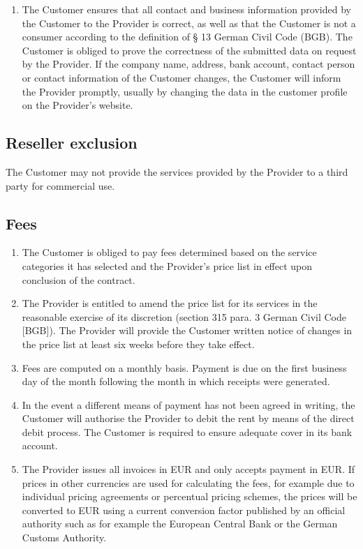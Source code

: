 \documentclass{terms}
\begin{document}
\begin{enumerate}
\item The Customer ensures that all contact and business information provided by the Customer to the Provider is correct, as well as that the Customer is not a consumer according to the definition of § 13 German Civil Code (BGB). The Customer is obliged to prove the correctness of the submitted data on request by the Provider. If the company name, address, bank account, contact person or contact information of the Customer changes, the Customer will inform the Provider promptly, usually by changing the data in the customer profile on the Provider’s website.
\end{enumerate}
\subsection{Reseller exclusion}
The Customer may not provide the services provided by the Provider to a third party for commercial use.
\subsection{Fees}
\begin{enumerate}
\item The Customer is obliged to pay fees determined based on the service categories it has selected and the Provider's price list in effect upon conclusion of the contract.
\item The Provider is entitled to amend the price list for its services in the reasonable exercise of its discretion (section 315 para. 3 German Civil Code [BGB]). The Provider will provide the Customer written notice of changes in the price list at least six weeks before they take effect.
\item Fees are computed on a monthly basis. Payment is due on the first business day of the month following the month in which receipts were generated.
\item In the event a different means of payment has not been agreed in writing, the Customer will authorise the Provider to debit the rent by means of the direct debit process. The Customer is required to ensure adequate cover in its bank account.
\item The Provider issues all invoices in EUR and only accepts payment in EUR. If prices in other currencies are used for calculating the fees, for example due to individual pricing agreements or percentual pricing schemes, the prices will be converted to EUR using a current conversion factor published by an official authority such as for example the European Central Bank or the German Customs Authority.
\end{enumerate}
\end{document}
